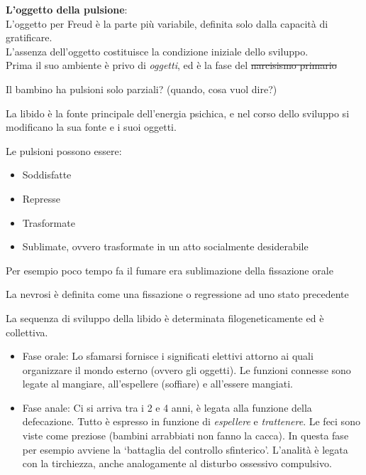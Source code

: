 \documentclass[
]{article}
\providecommand{\tightlist}{%
  \setlength{\itemsep}{0pt}\setlength{\parskip}{0pt}}
\begin{document}
\textbf{L'oggetto della pulsione}:\\
L'oggetto per Freud è la parte più variabile, definita solo dalla
capacità di gratificare.\\
L'assenza dell'oggetto costituisce la condizione iniziale dello
sviluppo.\\
Prima il suo ambiente è privo di \emph{oggetti}, ed è la fase del
\sout{narcisismo primario}

Il bambino ha pulsioni solo parziali? (quando, cosa vuol dire?)

La libido è la fonte principale dell'energia psichica, e nel corso dello
sviluppo si modificano la sua fonte e i suoi oggetti.

Le pulsioni possono essere:

\begin{itemize}
\tightlist
\item
  Soddisfatte
\item
  Represse
\item
  Trasformate
\item
  Sublimate, ovvero trasformate in un atto socialmente desiderabile
\end{itemize}

Per esempio poco tempo fa il fumare era sublimazione della fissazione
orale

La nevrosi è definita come una fissazione o regressione ad uno stato
precedente

La sequenza di sviluppo della libido è determinata filogeneticamente ed
è collettiva.

\begin{itemize}
\item
  Fase orale: Lo sfamarsi fornisce i significati elettivi attorno ai
  quali organizzare il mondo esterno (ovvero gli oggetti). Le funzioni
  connesse sono legate al mangiare, all'espellere (soffiare) e
  all'essere mangiati.
\item
  Fase anale: Ci si arriva tra i 2 e 4 anni, è legata alla funzione
  della defecazione. Tutto è espresso in funzione di \emph{espellere} e
  \emph{trattenere}. Le feci sono viste come preziose (bambini
  arrabbiati non fanno la cacca). In questa fase per esempio avviene la
  `battaglia del controllo sfinterico'. L'analità è legata con la
  tirchiezza, anche analogamente al disturbo ossessivo compulsivo.
\end{itemize}
\end{document}
